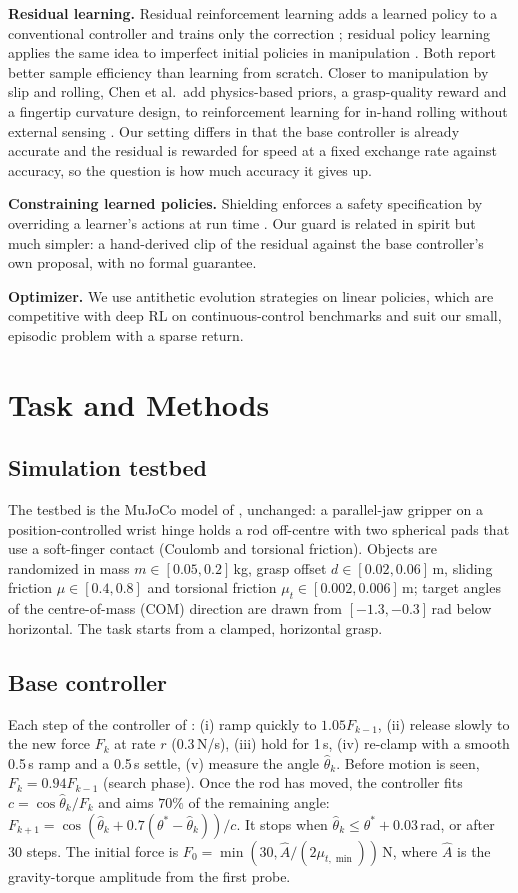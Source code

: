 \documentclass[11pt]{article}
\begin{document}
\textbf{Residual learning.} Residual reinforcement learning adds a learned policy to a conventional controller and trains only the correction \cite{johannink2019}; residual policy learning applies the same idea to imperfect initial policies in manipulation \cite{silver2018}. Both report better sample efficiency than learning from scratch. Closer to manipulation by slip and rolling, Chen et al.\ add physics-based priors, a grasp-quality reward and a fingertip curvature design, to reinforcement learning for in-hand rolling without external sensing \cite{chen2026}. Our setting differs in that the base controller is already accurate and the residual is rewarded for speed at a fixed exchange rate against accuracy, so the question is how much accuracy it gives up.

\textbf{Constraining learned policies.} Shielding enforces a safety specification by overriding a learner's actions at run time \cite{alshiekh2018}. Our guard is related in spirit but much simpler: a hand-derived clip of the residual against the base controller's own proposal, with no formal guarantee.

\textbf{Optimizer.} We use antithetic evolution strategies \cite{salimans2017} on linear policies, which are competitive with deep RL on continuous-control benchmarks \cite{mania2018} and suit our small, episodic problem with a sparse return.

\section{Task and Methods}\label{sec:setup}
\subsection{Simulation testbed}
The testbed is the MuJoCo \cite{todorov2012} model of \cite{aidoo2026a}, unchanged: a parallel-jaw gripper on a position-controlled wrist hinge holds a rod off-centre with two spherical pads that use a soft-finger contact (Coulomb and torsional friction). Objects are randomized in mass $m\in[0.05,0.2]$\,kg, grasp offset $d\in[0.02,0.06]$\,m, sliding friction $\mu\in[0.4,0.8]$ and torsional friction $\mu_t\in[0.002,0.006]$\,m; target angles of the centre-of-mass (COM) direction are drawn from $[-1.3,-0.3]$\,rad below horizontal. The task starts from a clamped, horizontal grasp.

\subsection{Base controller}
Each step of the controller of \cite{aidoo2026a}: (i) ramp quickly to $1.05F_{k-1}$, (ii) release slowly to the new force $F_k$ at rate $r$ (0.3\,N/s), (iii) hold for 1\,s, (iv) re-clamp with a smooth 0.5\,s ramp and a 0.5\,s settle, (v) measure the angle $\hat\theta_k$. Before motion is seen, $F_k=0.94F_{k-1}$ (search phase). Once the rod has moved, the controller fits $c=\cos\hat\theta_k/F_k$ and aims $70\%$ of the remaining angle: $F_{k+1}=\cos(\hat\theta_k+0.7(\theta^*-\hat\theta_k))/c$. It stops when $\hat\theta_k\le\theta^*+0.03$\,rad, or after 30 steps. The initial force is $F_0=\min(30, \hat A/(2\mu_{t,\min}))$\,N, where $\hat A$ is the gravity-torque amplitude from the first probe.
\end{document}
